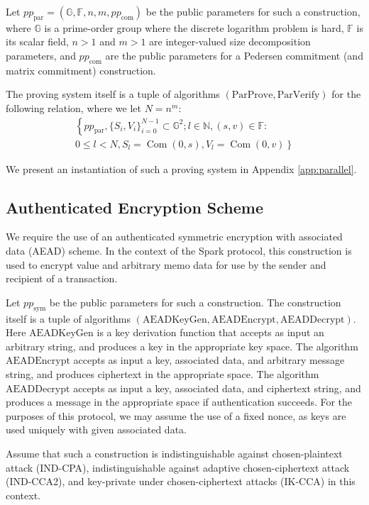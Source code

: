 \documentclass{llncs}
\newcommand{\G}{\mathbb{G}}
\newcommand{\F}{\mathbb{F}}
\newcommand{\com}{\operatorname{Com}}
\begin{document}
Let $pp_{\text{par}} = (\G, \F, n, m, pp_{\text{com}})$ be the public parameters for such a construction, where $\G$ is a prime-order group where the discrete logarithm problem is hard, $\F$ is its scalar field, $n > 1$ and $m > 1$ are integer-valued size decomposition parameters, and $pp_{\text{com}}$ are the public parameters for a Pedersen commitment (and matrix commitment) construction.

The proving system itself is a tuple of algorithms $(\text{ParProve},\text{ParVerify})$ for the following relation, where we let $N = n^m$:
\begin{multline*}
\left\{ pp_{\text{par}}, \{S_i,V_i\}_{i=0}^{N-1} \subset \G^2 ; l \in \mathbb{N}, (s,v) \in \F : \right. \\
\left. 0 \leq l < N, S_l = \com(0,s), V_l = \com(0,v) \right\}
\end{multline*}

We present an instantiation of such a proving system in Appendix \ref{app:parallel}.


\subsection{Authenticated Encryption Scheme}

We require the use of an authenticated symmetric encryption with associated data (AEAD) scheme.
In the context of the Spark protocol, this construction is used to encrypt value and arbitrary memo data for use by the sender and recipient of a transaction.

Let $pp_{\text{sym}}$ be the public parameters for such a construction.
The construction itself is a tuple of algorithms $(\text{AEADKeyGen},\text{AEADEncrypt},\text{AEADDecrypt})$.
Here $\text{AEADKeyGen}$ is a key derivation function that accepts as input an arbitrary string, and produces a key in the appropriate key space.
The algorithm $\text{AEADEncrypt}$ accepts as input a key, associated data, and arbitrary message string, and produces ciphertext in the appropriate space.
The algorithm $\text{AEADDecrypt}$ accepts as input a key, associated data, and ciphertext string, and produces a message in the appropriate space if authentication succeeds.
For the purposes of this protocol, we may assume the use of a fixed nonce, as keys are used uniquely with given associated data.

Assume that such a construction is indistinguishable against chosen-plaintext attack (IND-CPA), indistinguishable against adaptive chosen-ciphertext attack (IND-CCA2), and key-private under chosen-ciphertext attacks (IK-CCA) in this context.
\end{document}
